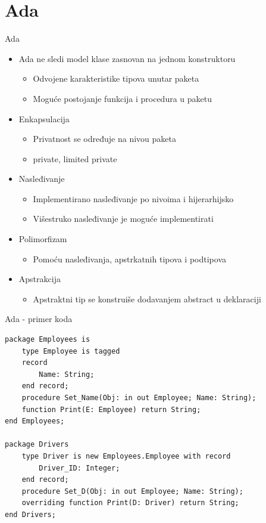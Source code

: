 \documentclass[14pt,aspectratio=169]{beamer}
\begin{document}
\section{Ada}
\begin{frame}[fragile]{Ada}
\begin{itemize}
	\item Ada ne sledi model klase zasnovan na jednom konstruktoru
	\begin{itemize}
		\item Odvojene karakteristike tipova unutar paketa
		\item Moguće postojanje funkcija i procedura u paketu
	\end{itemize}
	\item Enkapsulacija
	\begin{itemize}
		\item Privatnost se određuje na nivou paketa
		\item private, limited private
	\end{itemize}
	\item Nasleđivanje
	\begin{itemize}
		\item Implementirano nasleđivanje po nivoima i hijerarhijsko
		\item Višestruko nasleđivanje je moguće implementirati 
	\end{itemize}
	\item Polimorfizam
	\begin{itemize}
		\item Pomoću nasleđivanja, apstrkatnih tipova i podtipova
	\end{itemize}
	\item Apstrakcija
	\begin{itemize}
		\item Apstraktni tip se konstruiše dodavanjem abstract u deklaraciji
	\end{itemize}
\end{itemize}
\end{frame}

\begin{frame}[fragile]{Ada \small{- primer koda}}
\begin{lstlisting}[frame=single, label=lst:adaDeklaracija]
package Employees is 
	type Employee is tagged 
	record
		Name: String;
	end record;
	procedure Set_Name(Obj: in out Employee; Name: String);
	function Print(E: Employee) return String;
end Employees;

package Drivers
	type Driver is new Employees.Employee with record
		Driver_ID: Integer;
	end record;
	procedure Set_D(Obj: in out Employee; Name: String);
	overriding function Print(D: Driver) return String;
end Drivers;
\end{lstlisting}
\end{frame}
\end{document}
